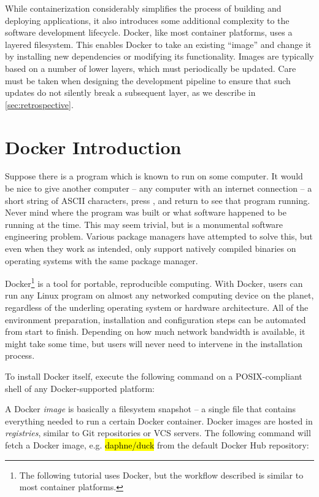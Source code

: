 \documentclass[12pt,initial,twoside,maitrise]{dms}
\newcommand{\inline}[1]{%
\begingroup%
\sethlcolor{slightgray}%
\hl{\ttfamily\small #1}%
\endgroup
}
\numberwithin{equation}{section}
\numberwithin{table}{chapter}
\numberwithin{figure}{chapter}
\begin{document}
While containerization considerably simplifies the process of building and deploying applications, it also introduces some additional complexity to the software development lifecycle. Docker, like most container platforms, uses a layered filesystem. This enables Docker to take an existing ``image'' and change it by installing new dependencies or modifying its functionality. Images are typically based on a number of lower layers, which must periodically be updated. Care must be taken when designing the development pipeline to ensure that such updates do not silently break a subsequent layer, as we describe in \autoref{sec:retrospective}.

\section{Docker Introduction}

Suppose there is a program which is known to run on some computer. It would be nice to give another computer -- any computer with an internet connection -- a short string of ASCII characters, press \keys{\return}, and return to see that program running. Never mind where the program was built or what software happened to be running at the time. This may seem trivial, but is a monumental software engineering problem. Various package managers have attempted to solve this, but even when they work as intended, only support natively compiled binaries on operating systems with the same package manager.

Docker\footnote{The following tutorial uses Docker, but the workflow described is similar to most container platforms.} is a tool for portable, reproducible computing. With Docker, users can run any Linux program on almost any networked computing device on the planet, regardless of the underling operating system or hardware architecture. All of the environment preparation, installation and configuration steps can be automated from start to finish. Depending on how much network bandwidth is available, it might take some time, but users will never need to intervene in the installation process.

To install Docker itself, execute the following command on a POSIX-compliant shell of any Docker-supported platform:

%
A Docker \textit{image} is basically a filesystem snapshot -- a single file that contains everything needed to run a certain Docker container. Docker images are hosted in \textit{registries}, similar to Git repositories or VCS servers. The following command will fetch a Docker image, e.g. \inline{daphne/duck} from the default Docker Hub repository:
\end{document}
